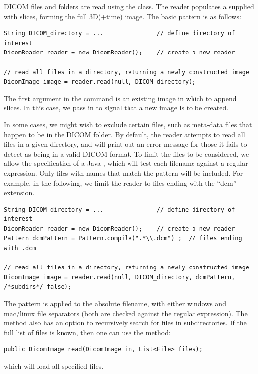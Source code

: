 DICOM files and folders are read using the  class.  The 
reader populates a supplied  with slices, forming the full 3D(+time)
image. The basic pattern is as follows:
\begin{lstlisting}[]
String DICOM_directory = ...               // define directory of interest
DicomReader reader = new DicomReader();    // create a new reader

// read all files in a directory, returning a newly constructed image
DicomImage image = reader.read(null, DICOM_directory);  
\end{lstlisting}
The first argument in the  command is an existing image in which to append slices.
In this case, we pass in  to signal that a new image is to be created.

In some cases, we might wish to exclude certain files, such as meta-data files that
happen to be in the DICOM folder.  By default, the reader attempts to read
all files in a given directory, and will print out an error message for those it fails
to detect as being in a valid DICOM format.  To limit the files to be considered,
we allow the specification of a Java , which will test
each filename against a regular expression.  Only files with names that match
the pattern will be included.  For example, in the following, we limit the reader
to files ending with the ``dcm'' extension.
\begin{lstlisting}[]
String DICOM_directory = ...               // define directory of interest
DicomReader reader = new DicomReader();    // create a new reader
Pattern dcmPattern = Pattern.compile(".*\\.dcm") ;  // files ending with .dcm

// read all files in a directory, returning a newly constructed image
DicomImage image = reader.read(null, DICOM_directory, dcmPattern, /*subdirs*/ false);  
\end{lstlisting}
The pattern is applied to the absolute filename, with either windows and mac/linux file
separators (both are checked against the regular expression).  The method also has
an option to recursively search for files in subdirectories.  If the full list of files is 
known, then one can use the method:
\begin{lstlisting}[]
public DicomImage read(DicomImage im, List<File> files);
\end{lstlisting}
which will load all specified files.

